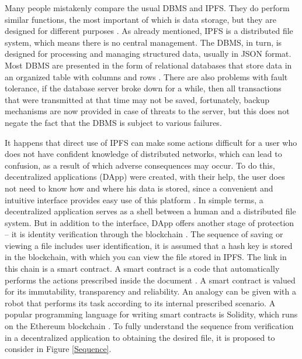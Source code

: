 \documentclass[10pt,conference,a4paper]{IEEEtran_EDM}
\begin{document}
Many people mistakenly compare the usual DBMS and IPFS. They do perform similar functions, the most important of which is data storage, but they are designed for different purposes \cite{Ruan}. As already mentioned, IPFS is a distributed file system, which means there is no central management. The DBMS, in turn, is designed for processing and managing structured data, usually in JSON format. Most DBMS are presented in the form of relational databases that store data in an organized table with columns and rows \cite{Gillenson}. There are also problems with fault tolerance, if the database server broke down for a while, then all transactions that were transmitted at that time may not be saved, fortunately, backup mechanisms are now provided in case of threats to the server, but this does not negate the fact that the DBMS is subject to various failures. 

It happens that direct use of IPFS can make some actions difficult for a user who does not have confident knowledge of distributed networks, which can lead to confusion, as a result of which adverse consequences may occur. To do this, decentralized applications (DApp) were created, with their help, the user does not need to know how and where his data is stored, since a convenient and intuitive interface provides easy use of this platform \cite{Infante}. In simple terms, a decentralized application serves as a shell between a human and a distributed file system. But in addition to the interface, DApp offers another stage of protection – it is identity verification through the blockchain \cite{Lin}. The sequence of saving or viewing a file includes user identification, it is assumed that a hash key is stored in the blockchain, with which you can view the file stored in IPFS. The link in this chain is a smart contract. A smart contract is a code that automatically performs the actions prescribed inside the document \cite{Frolov}. A smart contract is valued for its immutability, transparency and reliability. An analogy can be given with a robot that performs its task according to its internal prescribed scenario. A popular programming language for writing smart contracts is Solidity, which runs on the Ethereum blockchain \cite{Khan Nabeel}. To fully understand the sequence from verification in a decentralized application to obtaining the desired file, it is proposed to consider in Figure \ref{Sequence}.
\end{document}
